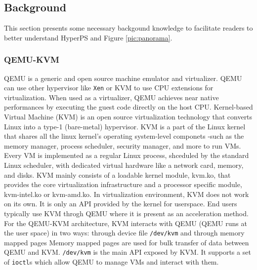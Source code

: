 \subsection{Background}%
\label{sub:background}
This section presents some necessary backgound knowledge to facilitate readers to better understand HyperPS and Figure \ref{pic:panorama}.
\subsubsection{QEMU-KVM}%
\label{ssub:qemu_kvm}
QEMU is a generic and open source machine emulator and virtualizer. QEMU can use other hypervisor like \verb|Xen| or KVM to use CPU extensions for virtualization. When used as a virtualizer, QEMU achieves near native performances by executing the guest code directly on the host CPU.
Kernel-based Virtual Machine (KVM) is an open source virtualization technology that converts Linux into a type-1 (bare-metal) hypervisor. KVM is a part of the Linux kernel that shares all the linux kernel's operating system-level componets -such as the memory manager, process scheduler, security manager, and more to run VMs. Every VM is implemented as a regular Linux process, shceduled by the standard Linux scheduler, with dedicated virtual hardware like a network card, memory, and disks. KVM mainly consists of a loadable kernel module, kvm.ko, that provides the core virtualization infrastructure and a processor specific module, kvm-intel.ko or kvm-amd.ko.
In virtualization environment, KVM does not work on its own. It is only an API provided by the kernel for userspace. End users typically use KVM throgh QEMU where it is present as an acceleration method.
For the QEMU-KVM architecture, KVM interacts with QEMU (QEMU runs at the user space) in two ways: through device file \verb|/dev/kvm| and through memory mapped pages
Memory mapped pages are used for bulk transfer of data between QEMU and KVM. \verb|/dev/kvm| is the main API exposed by KVM. It supports a set of \verb|ioctl|s which allow QEMU to manage VMs and interact with them.



